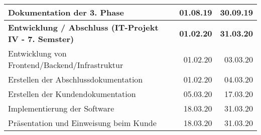 \begin{table}[htp]
\begin{tabular}{|l|r|r|}
    Dokumentation der 3. Phase                                    & 01.08.19          & 30.09.19 \\ \hline
    \textbf{Entwicklung / Abschluss (IT-Projekt IV - 7. Semster)} & \textbf{01.02.20} & \textbf{31.03.20} \\ \hline
    Entwicklung von Frontend/Backend/Infrastruktur                & 01.02.20          & 03.03.20 \\ \hline
    Erstellen der Abschlussdokumentation                          & 01.02.20          & 04.03.20 \\ \hline
    Erstellen der Kundendokumentation                             & 05.03.20          & 17.03.20 \\ \hline
    Implementierung der Software                                  & 18.03.20          & 31.03.20 \\ \hline
    Präsentation und Einweisung beim Kunde                        & 18.03.20          & 31.03.20 \\ \hline
  \end{tabular}
  \egroup
  \label{tab:zeitplanung}
\end{table}

\newpage